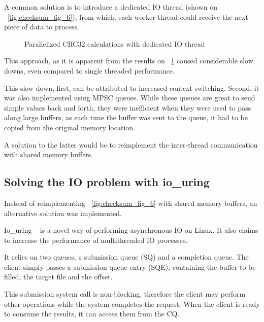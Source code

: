 A common solution is to introduce a dedicated IO thread (shown on ~\ref{fig:checksum_fig_6}), from which, each worker thread could
receive the next piece of data to process.

\begin{figure}[H]
    \centering
    \begin{bchart}[step=50,max=400, unit=s]
        \medskip
        \medskip
        \medskip
        \medskip
    \end{bchart}
    \caption{Parallelized CRC32 calculations with dedicated IO thread}
    \label{fig:checksum_fig_7}
\end{figure}


This approach, as it is apparent from the results on ~\ref{fig:checksum_fig_7} caused considerable slow downs,
even compared to single threaded performance.

This slow down, first, can be attributed to increased context switching.
Second, it was also implemented using MPSC queues.
While these queues are great to send simple values back and forth, they were inefficient
when they were used to pass along large buffers, as each time the buffer was sent to the queue,
it had to be copied from the original memory location.

A solution to the latter would be to reimplement the inter-thread communication with shared memory buffers.


\subsection{Solving the IO problem with io\_uring}
Instead of reimplementing ~\ref{fig:checksum_fig_6} with shared memory buffers, an alternative
solution was implemented.

Io\_uring ~\cite{IO_uring} is a novel way of performing asynchronous IO on Linux.
It also claims to increase the performance of multithreaded IO processes.

It relies on two queues, a submission queue (SQ) and a completion queue.
The client simply passes a submission queue entry (SQE), containing the buffer to be filled,
the target file and the offset.

This submission system call is non-blocking, therefore the client may perform other operations
while the system completes the request.
When the client is ready to consume the results,
it can access them from the CQ\@.

